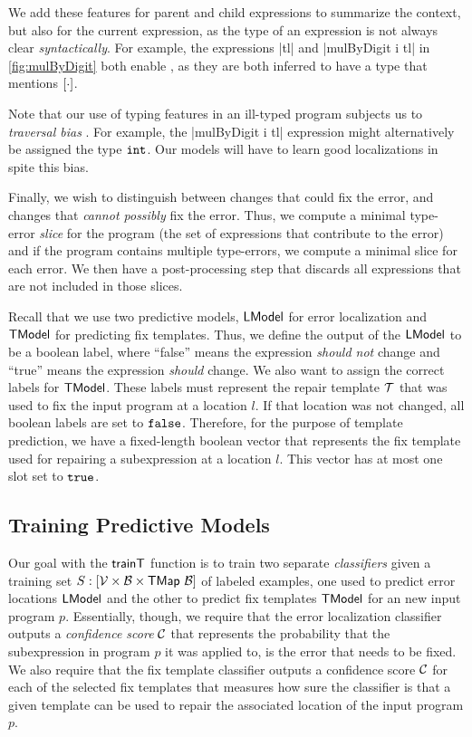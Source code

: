 We add these features for parent and child expressions to summarize the context,
but also for the current expression, as the type of an expression is not always
clear \emph{syntactically}. For example, the expressions |tl| and
|mulByDigit i tl| in \autoref{fig:mulByDigit} both enable \HasTypeList, as they
are both inferred to have a type that mentions $[\cdot]$.

Note that our use of typing features in an ill-typed program subjects us to
\emph{traversal bias} \citep{McAdam1998-ub}. For example, the |mulByDigit i tl|
expression might alternatively be assigned the type $\mathtt{int}$. Our models will
have to learn good localizations in spite this bias.

Finally, we wish to distinguish between changes that could fix the error, and
changes that \emph{cannot possibly} fix the error. Thus, we compute a minimal
type-error \emph{slice} for the program (\ie the set of expressions that
contribute to the error) and if the program contains multiple type-errors, we
compute a minimal slice for each error. We then have a post-processing step that
discards all expressions that are not included in those slices.


Recall that we use two predictive models, $\mathsf{LModel}$ for error localization and
$\mathsf{TModel}$ for predicting fix templates. Thus, we define the output of the
$\mathsf{LModel}$ to be a boolean label, where ``false'' means the expression
\emph{should not} change and ``true'' means the expression \emph{should} change.
We also want to assign the correct labels for $\mathsf{TModel}$. These labels must
represent the repair template $\mathcal{T}$ that was used to fix the input program at a
location $l$. If that location was not changed, all boolean labels are set to
$\mathtt{false}$. Therefore, for the purpose of template prediction, we have a
fixed-length boolean vector that represents the fix template used for repairing
a subexpression at a location $l$. This vector has at most one slot set to
$\mathtt{true}$.

\subsection{Training Predictive Models}
\label{subsec:train}
\lstDeleteShortInline{|} %

Our goal with the $\mathsf{trainT}$ function is to train two separate
\emph{classifiers} given a training set $S : [\mathcal{V} \times \mathcal{B} \times
\mathsf{TMap}\ \mathcal{B}]$ of labeled examples, one used to predict error locations $\mathsf{LModel}$
and the other to predict fix templates $\mathsf{TModel}$ for an new input program $p$.
Essentially, though, we require that the error localization classifier outputs a
\emph{confidence score} $\mathcal{C}$ that represents the probability that the
subexpression in program $p$ it was applied to, is the error that needs to be
fixed. We also require that the fix template classifier outputs a confidence
score $\mathcal{C}$ for each of the selected fix templates that measures how sure the
classifier is that a given template can be used to repair the associated
location of the input program $p$.

